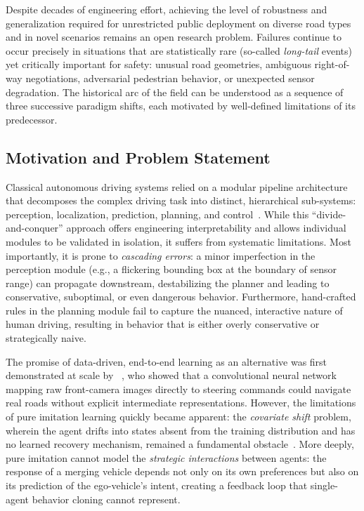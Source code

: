 \documentclass[12pt, a4paper]{article}
\begin{document}
Despite decades of engineering effort, achieving the level of robustness and
generalization required for unrestricted public deployment on diverse road
types and in novel scenarios remains an open research problem.  Failures
continue to occur precisely in situations that are statistically rare (so-called
\emph{long-tail} events) yet critically important for safety: unusual road
geometries, ambiguous right-of-way negotiations, adversarial pedestrian
behavior, or unexpected sensor degradation.  The historical arc of the field
can be understood as a sequence of three successive paradigm shifts, each
motivated by well-defined limitations of its predecessor.

\subsection{Motivation and Problem Statement}
\label{sec:motivation}

Classical autonomous driving systems relied on a modular pipeline
architecture that decomposes the complex driving task into distinct,
hierarchical sub-systems: perception, localization, prediction, planning,
and control~\cite{caesar2021nuplan}.  While this ``divide-and-conquer''
approach offers engineering interpretability and allows individual modules
to be validated in isolation, it suffers from systematic limitations.
Most importantly, it is prone to \emph{cascading errors}: a minor
imperfection in the perception module (e.g., a flickering bounding box at
the boundary of sensor range) can propagate downstream, destabilizing the
planner and leading to conservative, suboptimal, or even dangerous
behavior.  Furthermore, hand-crafted rules in the planning module fail to
capture the nuanced, interactive nature of human driving, resulting in
behavior that is either overly conservative or strategically naive.

The promise of data-driven, end-to-end learning as an alternative was first
demonstrated at scale by \citeauthor{bojarski2016end}~\cite{bojarski2016end},
who showed that a convolutional neural network mapping raw front-camera images
directly to steering commands could navigate real roads without explicit
intermediate representations.  However, the limitations of pure imitation
learning quickly became apparent: the \emph{covariate shift} problem, wherein
the agent drifts into states absent from the training distribution and has no
learned recovery mechanism, remained a fundamental obstacle~\cite{bansal2018chauffeur}.
More deeply, pure imitation cannot model the \emph{strategic interactions}
between agents: the response of a merging vehicle depends not only on its own
preferences but also on its prediction of the ego-vehicle's intent, creating a
feedback loop that single-agent behavior cloning cannot represent.
\end{document}
